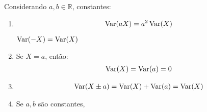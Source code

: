 \begin{description}
             Considerando $a,b \in \mathbb{R}$, constantes:
             \begin{enumerate}[label=(\alph*)]
               \item 
                 \begin{align*}
                 \operatorname{Var}(aX)=a^2\operatorname{Var}(X)
               \end{align*}
                 \begin{description}
                   \begin{obs}$\operatorname{Var}(-X)=\operatorname{Var}(X)$\end{obs}
               \end{description}
               \item Se $X=a$, então:
                 \begin{align*}
    \operatorname{Var}(X)=\operatorname{Var}(a)=0
               \end{align*}
             \item 
               \begin{align*}
               \operatorname{Var}(X \pm a)=\operatorname{Var}(X)+\operatorname{Var}(a)=\operatorname{Var}(X)
             \end{align*}
             \item Se $a,b$ são constantes,


\end{enumerate}
\end{description}

